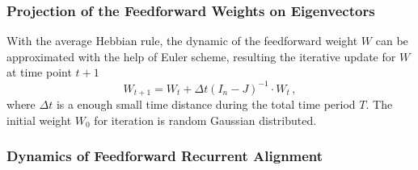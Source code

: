 \documentclass[11pt]{article}
\begin{document}
	\subsubsection{Projection of the Feedforward Weights on Eigenvectors}
	With the average Hebbian rule, the dynamic of the feedforward weight $W$ can be approximated with the help of Euler scheme, resulting the iterative update for $W$ at time point $t+1$
		\begin{equation}
			W_{t+1} = W_t + \Delta t (I_n - J)^{-1} \cdot W_t \, , 
		\end{equation}
	where $\Delta t$ is a enough small time distance during the total time period $T$. The initial weight $W_0$ for iteration is random Gaussian distributed.
	
	
	
	\subsubsection{Dynamics of Feedforward Recurrent Alignment}
	
	
\end{document}
